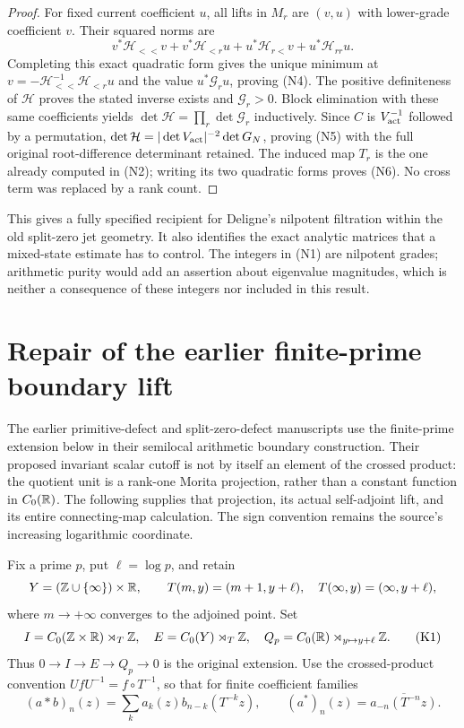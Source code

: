 \documentclass[11pt]{article}
\begin{document}
\begin{proof}
For fixed current coefficient $u$, all lifts in $M_r$ are $(v,u)$
with lower-grade coefficient $v$. Their squared norms are
\[
 v^*\mathcal H_{<<}v+v^*\mathcal H_{<r}u+
 u^*\mathcal H_{r<}v+u^*\mathcal H_{rr}u.
\]
Completing this exact quadratic form gives the unique minimum at
$v=-\mathcal H_{<<}^{-1}\mathcal H_{<r}u$ and the value
$u^*\mathcal G_ru$, proving (N4). The positive definiteness of
$\mathcal H$ proves the stated inverse exists and $\mathcal G_r>0$.
Block elimination with these same coefficients yields
$\det\mathcal H=\prod_r\det\mathcal G_r$ inductively. Since
$C$ is $V_{\rm act}^{-1}$ followed by a permutation,
$\det\mathcal H=|\det V_{\rm act}|^{-2}\det G_N$, proving (N5) with the
full original root-difference determinant retained. The induced map
$T_r$ is the one already computed in (N2); writing its two quadratic
forms proves (N6). No cross term was replaced by a rank count.
\end{proof}

This gives a fully specified recipient for Deligne's nilpotent
filtration within the old split-zero jet geometry. It also identifies
the exact analytic matrices that a mixed-state estimate has to control.
The integers in (N1) are nilpotent grades; arithmetic purity would
add an assertion about eigenvalue magnitudes, which is neither a
consequence of these integers nor included in this result.

\section{Repair of the earlier finite-prime boundary lift}
The earlier primitive-defect and split-zero-defect manuscripts use the
finite-prime extension below in their semilocal arithmetic boundary
construction. Their proposed invariant scalar cutoff is not by itself
an element of the crossed product: the quotient unit is a rank-one
Morita projection, rather than a constant function in $C_0(\mathbb R)$.
The following supplies that projection, its actual self-adjoint lift,
and its entire connecting-map calculation. The sign convention remains
the source's increasing logarithmic coordinate.

Fix a prime $p$, put $\ell=\log p$, and retain
\[
 Y=(\mathbb Z\cup\{\infty\})\times\mathbb R,\qquad
 T(m,y)=(m+1,y+\ell),\quad T(\infty,y)=(\infty,y+\ell),
\]
where $m\to+\infty$ converges to the adjoined point. Set
\[
 I=C_0(\mathbb Z\times\mathbb R)\rtimes_T\mathbb Z,
 \quad E=C_0(Y)\rtimes_T\mathbb Z,
 \quad Q_p=C_0(\mathbb R)\rtimes_{y\mapsto y+\ell}\mathbb Z.
 \tag{K1}
\]
Thus $0\to I\to E\to Q_p\to0$ is the original extension. Use the
crossed-product convention $U f U^{-1}=f\circ T^{-1}$, so that for
finite coefficient families
\[
 (a*b)_n(z)=\sum_k a_k(z)b_{n-k}(T^{-k}z),\qquad
 (a^*)_n(z)=\overline{a_{-n}(T^{-n}z)}.
 \tag{K2}
\]
\end{document}
